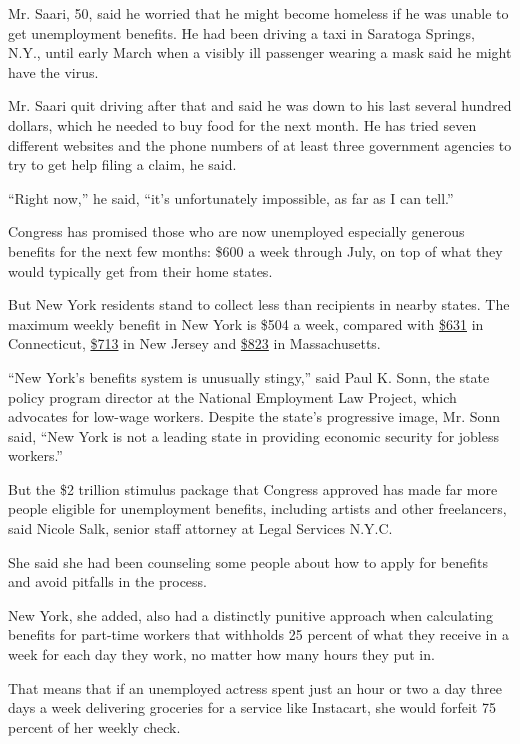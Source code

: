Mr. Saari, 50, said he worried that he might become homeless if he was
unable to get unemployment benefits. He had been driving a taxi in
Saratoga Springs, N.Y., until early March when a visibly ill passenger
wearing a mask said he might have the virus.

Mr. Saari quit driving after that and said he was down to his last
several hundred dollars, which he needed to buy food for the next month.
He has tried seven different websites and the phone numbers of at least
three government agencies to try to get help filing a claim, he said.

``Right now,'' he said, ``it's unfortunately impossible, as far as I can
tell.''

Congress has promised those who are now unemployed especially generous
benefits for the next few months: \$600 a week through July, on top of
what they would typically get from their home states.

But New York residents stand to collect less than recipients in nearby
states. The maximum weekly benefit in New York is \$504 a week, compared
with
\href{https://www.cbia.com/news/issues-policies/ct-raises-unemployment-benefit/}{\$631}
in Connecticut,
\href{https://www.nj.gov/labor/lwdhome/press/2019/20200113_benefitrates.shtml}{\$713}
in New Jersey and
\href{https://www.mass.gov/info-details/how-your-unemployment-benefits-are-determined\#calculating-your-maximum-benefit-credit-}{\$823}
in Massachusetts.

``New York's benefits system is unusually stingy,'' said Paul K. Sonn,
the state policy program director at the National Employment Law
Project, which advocates for low-wage workers. Despite the state's
progressive image, Mr. Sonn said, ``New York is not a leading state in
providing economic security for jobless workers.''

But the \$2 trillion stimulus package that Congress approved has made
far more people eligible for unemployment benefits, including artists
and other freelancers, said Nicole Salk, senior staff attorney at Legal
Services N.Y.C.

She said she had been counseling some people about how to apply for
benefits and avoid pitfalls in the process.

New York, she added, also had a distinctly punitive approach when
calculating benefits for part-time workers that withholds 25 percent of
what they receive in a week for each day they work, no matter how many
hours they put in.

That means that if an unemployed actress spent just an hour or two a day
three days a week delivering groceries for a service like Instacart, she
would forfeit 75 percent of her weekly check.

